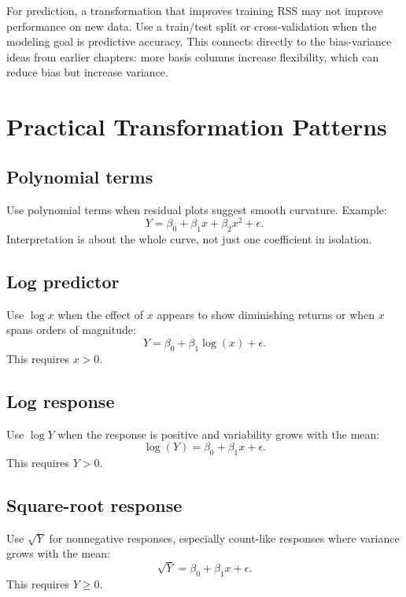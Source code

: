 For prediction, a transformation that improves training RSS may not improve performance on new data.  Use a train/test split or cross-validation when the modeling goal is predictive accuracy.  This connects directly to the bias-variance ideas from earlier chapters: more basis columns increase flexibility, which can reduce bias but increase variance.

\section{Practical Transformation Patterns}

\subsection*{Polynomial terms}

Use polynomial terms when residual plots suggest smooth curvature.  Example:
\begin{equation}
  Y=\beta_0+\beta_1x+\beta_2x^2+\epsilon.
\end{equation}
Interpretation is about the whole curve, not just one coefficient in isolation.

\subsection*{Log predictor}

Use \(\log x\) when the effect of \(x\) appears to show diminishing returns or when \(x\) spans orders of magnitude:
\begin{equation}
  Y=\beta_0+\beta_1\log(x)+\epsilon.
\end{equation}
This requires \(x>0\).

\subsection*{Log response}

Use \(\log Y\) when the response is positive and variability grows with the mean:
\begin{equation}
  \log(Y)=\beta_0+\beta_1x+\epsilon.
\end{equation}
This requires \(Y>0\).

\subsection*{Square-root response}

Use \(\sqrt{Y}\) for nonnegative responses, especially count-like responses where variance grows with the mean:
\begin{equation}
  \sqrt{Y}=\beta_0+\beta_1x+\epsilon.
\end{equation}
This requires \(Y\ge 0\).

